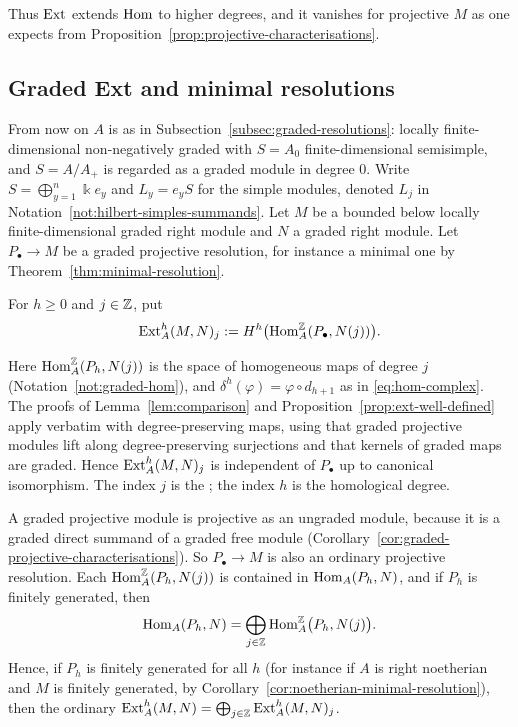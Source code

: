 Thus $\operatorname{Ext}\nolimits$ extends $\operatorname{Hom}\nolimits$ to higher degrees, and it vanishes for projective $M$ as one expects from Proposition~\ref{prop:projective-characterisations}.

\subsection{Graded Ext and minimal resolutions}\label{subsec:graded-ext}

From now on $A$ is as in Subsection~\ref{subsec:graded-resolutions}: locally finite-dimensional non-negatively graded with $S=A_0$ finite-dimensional semisimple, and $S=A/A_+$ is regarded as a graded module in degree $0$.
Write $S=\bigoplus_{y=1}^n\Bbbk e_y$ and $L_y=e_yS$ for the simple modules, denoted $L_j$ in Notation~\ref{not:hilbert-simples-summands}.
Let $M$ be a bounded below locally finite-dimensional graded right module and $N$ a graded right module.
Let $P_\bullet\to M$ be a graded projective resolution, for instance a minimal one by Theorem~\ref{thm:minimal-resolution}.

\begin{definition}\label{def:graded-ext}
For $h\geq0$ and $j\in\mathbb{Z}$, put
\[
\operatorname{Ext}\nolimits_A^h(M,N)_j:=H^h\bigl(\operatorname{Hom}\nolimits_A^{\mathbb{Z}}(P_\bullet,N(j))\bigr).
\]
\end{definition}

Here $\operatorname{Hom}\nolimits_A^{\mathbb{Z}}(P_h,N(j))$ is the space of homogeneous maps of degree $j$ (Notation~\ref{not:graded-hom}), and $\delta^h(\varphi)=\varphi\circ d_{h+1}$ as in \eqref{eq:hom-complex}.
The proofs of Lemma~\ref{lem:comparison} and Proposition~\ref{prop:ext-well-defined} apply verbatim with degree-preserving maps, using that graded projective modules lift along degree-preserving surjections and that kernels of graded maps are graded.
Hence $\operatorname{Ext}\nolimits_A^h(M,N)_j$ is independent of $P_\bullet$ up to canonical isomorphism.
The index $j$ is the ; the index $h$ is the homological degree.

\begin{remark}\label{rem:graded-ext-ungraded}
A graded projective module is projective as an ungraded module, because it is a graded direct summand of a graded free module (Corollary~\ref{cor:graded-projective-characterisations}).
So $P_\bullet\to M$ is also an ordinary projective resolution.
Each $\operatorname{Hom}\nolimits_A^{\mathbb{Z}}(P_h,N(j))$ is contained in $\operatorname{Hom}\nolimits_A(P_h,N)$, and if $P_h$ is finitely generated, then
\[
\operatorname{Hom}\nolimits_A(P_h,N)=\bigoplus_{j\in\mathbb{Z}}\operatorname{Hom}\nolimits_A^{\mathbb{Z}}\bigl(P_h,N(j)\bigr).
\]
Hence, if $P_h$ is finitely generated for all $h$ (for instance if $A$ is right noetherian and $M$ is finitely generated, by Corollary~\ref{cor:noetherian-minimal-resolution}), then the ordinary $\operatorname{Ext}\nolimits_A^h(M,N)=\bigoplus_{j\in\mathbb{Z}}\operatorname{Ext}\nolimits_A^h(M,N)_j$.
\end{remark}

